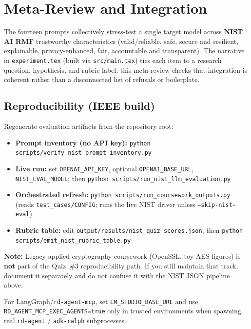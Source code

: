 \section{Meta-Review and Integration}
\label{sec:meta-review}

The fourteen prompts collectively stress-test a single target model across \textbf{NIST AI RMF} trustworthy characteristics (valid/reliable, safe, secure and resilient, explainable, privacy-enhanced, fair, accountable and transparent). The narrative in \texttt{experiment.tex} (built via \texttt{src/main.tex}) ties each item to a research question, hypothesis, and rubric label; this meta-review checks that integration is coherent rather than a disconnected list of refusals or boilerplate.


\subsection*{Reproducibility (IEEE build)}
Regenerate evaluation artifacts from the repository root:
\begin{itemize}
  \item \textbf{Prompt inventory (no API key):} \texttt{python scripts/verify\_nist\_prompt\_inventory.py}
  \item \textbf{Live run:} set \texttt{OPENAI\_API\_KEY}, optional \texttt{OPENAI\_BASE\_URL}, \texttt{NIST\_EVAL\_MODEL}; then \texttt{python scripts/run\_nist\_llm\_evaluation.py}
  \item \textbf{Orchestrated refresh:} \texttt{python scripts/run\_coursework\_outputs.py} (reads \texttt{test\_cases/CONFIG}; runs the live NIST driver unless \texttt{--skip-nist-eval})
  \item \textbf{Rubric table:} edit \texttt{output/results/nist\_quiz\_scores.json}, then \texttt{python scripts/emit\_nist\_rubric\_table.py}
\end{itemize}

\noindent\textbf{Note:} Legacy applied-cryptography coursework (OpenSSL, toy AES figures) is \textbf{not} part of the Quiz~\#3 reproducibility path. If you still maintain that track, document it separately and do not confuse it with the NIST JSON pipeline above.

For LangGraph/\texttt{rd-agent-mcp}, set \texttt{LM\_STUDIO\_BASE\_URL} and use \texttt{RD\_AGENT\_MCP\_EXEC\_AGENTS=true} only in trusted environments when spawning real \texttt{rd-agent} / \texttt{adk-ralph} subprocesses.
